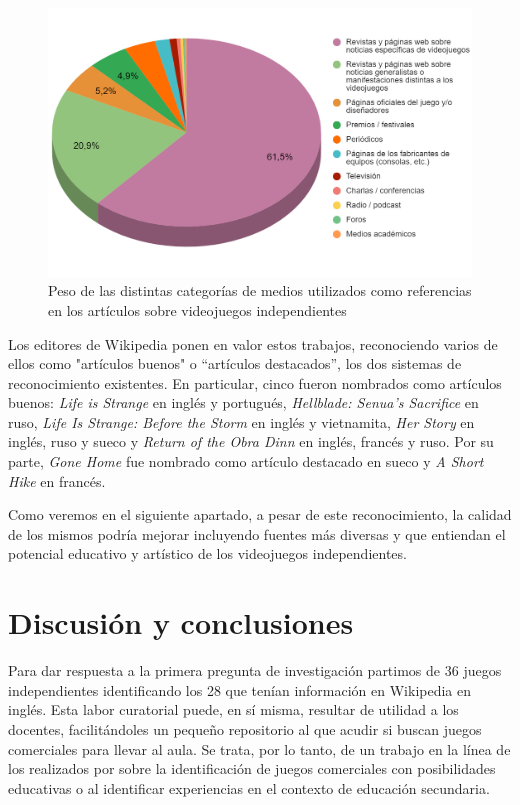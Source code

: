\documentclass[spanish]{textolivre}
\begin{document}
\begin{figure}[htbp]
\centering
\begin{minipage}{.85\textwidth}
 \includegraphics[width=\textwidth]{fig05.png}
 \caption{Peso de las distintas categorías de medios utilizados como referencias en los artículos sobre videojuegos independientes}
 \label{fig05}
\end{minipage}
\end{figure}

Los editores de Wikipedia ponen en valor estos trabajos, reconociendo varios de ellos como "artículos buenos" o “artículos destacados”, los dos sistemas de reconocimiento existentes. En particular, cinco fueron nombrados como artículos buenos: \emph{Life is Strange} en inglés y portugués, \emph{Hellblade: Senua's Sacrifice} en ruso, \emph{Life Is Strange: Before the Storm} en inglés y vietnamita, \emph{Her Story} en inglés, ruso y sueco y \emph{Return of the Obra Dinn} en inglés, francés y ruso. Por su parte, \textit{Gone Home} fue nombrado como artículo destacado en sueco y \emph{A Short Hike} en francés.

Como veremos en el siguiente apartado, a pesar de este reconocimiento, la calidad de los mismos podría mejorar incluyendo fuentes más diversas y que entiendan el potencial educativo y artístico de los videojuegos independientes.



\section{Discusión y conclusiones}

Para dar respuesta a la primera pregunta de investigación partimos de 36 juegos independientes identificando los 28 que tenían información en Wikipedia en inglés. Esta labor curatorial puede, en sí misma, resultar de utilidad a los docentes, facilitándoles un pequeño repositorio al que acudir si buscan juegos comerciales para llevar al aula. Se trata, por lo tanto, de un trabajo en la línea de los realizados por \textcite{becker2017choosing} sobre la identificación de juegos comerciales con posibilidades educativas o \textcite{rojas-garcia_alisis_2022} al identificar experiencias en el contexto de educación secundaria.
\end{document}
